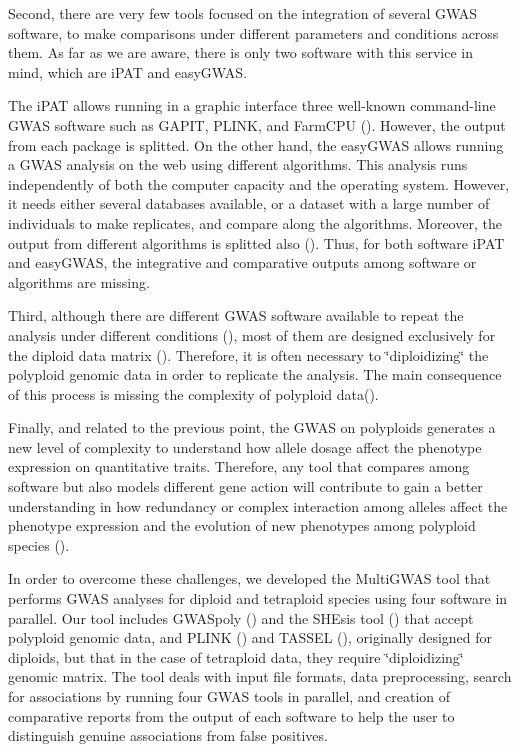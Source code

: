 \documentclass{article}
\begin{document}
Second, there are very few tools focused on the integration of several GWAS software, to make comparisons under different parameters and conditions across them. As far as we are aware, there is only two software with this service in mind, which are iPAT and easyGWAS.

The iPAT allows running in a graphic interface three well-known command-line GWAS software such as GAPIT, PLINK, and FarmCPU (\cite{Zhang2018}). However, the output from each package is splitted. On the other hand, the easyGWAS allows running a GWAS analysis on the web using different algorithms. This analysis runs independently of both the computer capacity and the operating system. However, it needs either several databases available, or a dataset with a large number of individuals to make replicates, and compare along the algorithms. Moreover, the output from different algorithms is splitted also (\cite{Grimm2017}). Thus, for both software iPAT and easyGWAS, the integrative and comparative outputs among software or algorithms are missing. 

Third, although there are different GWAS software available to repeat the analysis under different conditions (\cite{Gumpinger2018}), most of them are designed exclusively for the diploid data matrix (\cite{Bourke2018}). Therefore, it is often necessary to \char`\"{}diploidizing\char`\"{} the polyploid genomic data in order to replicate the analysis. The main consequence of this process is missing the complexity of polyploid data(\cite{Ferrao2018}). 

Finally, and related to the previous point, the GWAS on polyploids generates a new level of complexity to understand how allele dosage affect the phenotype expression on quantitative traits. Therefore, any tool that compares among software but also models different gene action will contribute to gain a better understanding in how redundancy or complex interaction among alleles affect the phenotype expression and the evolution of new phenotypes among polyploid species (\cite{Bourke2018, Rosyara2016, Ferrao2018}). 

In order to overcome these challenges, we developed the MultiGWAS tool that performs GWAS analyses for diploid and tetraploid species using four software in parallel. Our tool includes GWASpoly (\cite{Rosyara2016}) and the SHEsis tool (\cite{Shen2016}) that accept polyploid genomic data, and PLINK (\cite{Purcell2007}) and TASSEL (\cite{Bradbury2007}), originally designed for diploids, but that in the case of tetraploid data, they require  \char`\"{}diploidizing\char`\"{} genomic matrix. The tool deals with input file formats, data preprocessing, search for associations by running four GWAS tools in parallel, and creation of comparative reports from the output of each software to help the user to distinguish genuine associations from false positives.
\end{document}
